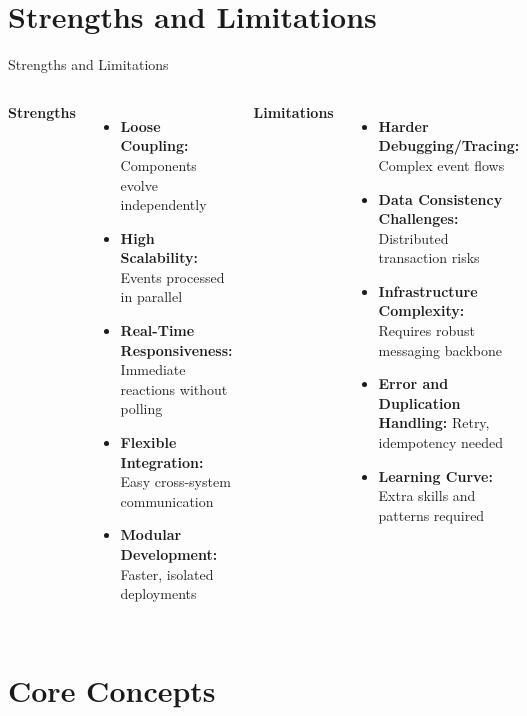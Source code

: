 \documentclass[aspectratio=169, table]{beamer}
\begin{document}
	
	\section{Strengths and Limitations}
	
	\begin{frame}[fragile]{Strengths and Limitations}
		\vspace{10pt}
		\begin{columns}[T]
			\textbf{Strengths}
			\begin{itemize}
				\item \textbf{Loose Coupling:} Components evolve independently
				\item \textbf{High Scalability:} Events processed in parallel
				\item \textbf{Real-Time Responsiveness:} Immediate reactions without polling
				\item \textbf{Flexible Integration:} Easy cross-system communication
				\item \textbf{Modular Development:} Faster, isolated deployments
			\end{itemize}
			
			\textbf{Limitations}
			\begin{itemize}
				\item \textbf{Harder Debugging/Tracing:} Complex event flows
				\item \textbf{Data Consistency Challenges:} Distributed transaction risks
				\item \textbf{Infrastructure Complexity:} Requires robust messaging backbone
				\item \textbf{Error and Duplication Handling:} Retry, idempotency needed
				\item \textbf{Learning Curve:} Extra skills and patterns required
			\end{itemize}
		\end{columns}
	\end{frame}
	
	\section{Core Concepts}
	
\end{document}
